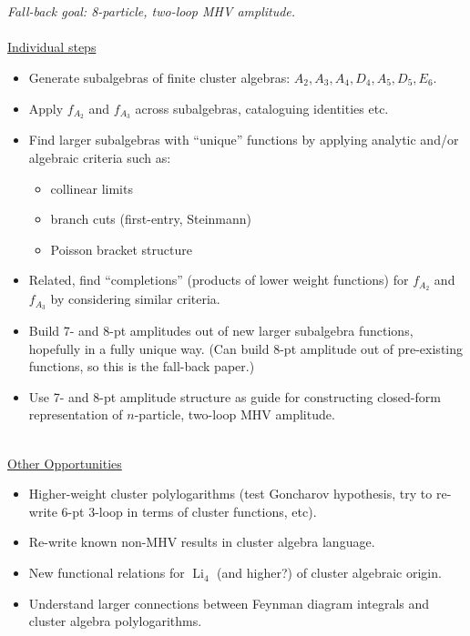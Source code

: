 \documentclass[12pt]{article}
\DeclareMathOperator{\Li}{Li}
\begin{document}
\thispagestyle{fancyplain}
\fancyhf{}


\\ \\
\emph{Fall-back goal: 8-particle, two-loop MHV amplitude.}\\ \\

\underline{Individual steps}
\begin{itemize}
	\item Generate subalgebras of finite cluster algebras: $A_2, A_3, A_4, D_4, A_5, D_5, E_6$.
	\item Apply $f_{A_2}$ and $f_{A_3}$ across subalgebras, cataloguing identities etc.
	\item Find larger subalgebras with ``unique'' functions by applying analytic and/or algebraic criteria such as:
		\begin{itemize}
		\item collinear limits
		\item branch cuts (first-entry, Steinmann)
		\item Poisson bracket structure
		\end{itemize}
	\item Related, find ``completions'' (products of lower weight functions) for $f_{A_2}$ and $f_{A_3}$ by considering similar criteria.
	\item Build 7- and 8-pt amplitudes out of new larger subalgebra functions, hopefully in a fully unique way. (Can build 8-pt amplitude out of pre-existing functions, so this is the fall-back paper.)
	\item Use 7- and 8-pt amplitude structure as guide for constructing closed-form representation of $n$-particle, two-loop MHV amplitude. \\\\
\end{itemize}

\underline{Other Opportunities}
\begin{itemize}
	\item Higher-weight cluster polylogarithms (test Goncharov hypothesis, try to re-write 6-pt 3-loop in terms of cluster functions, etc).
	\item Re-write known non-MHV results in cluster algebra language.
	\item New functional relations for $\Li_4$ (and higher?) of cluster algebraic origin.
	\item Understand larger connections between Feynman diagram integrals and cluster algebra polylogarithms.
\end{itemize}
\end{document}

